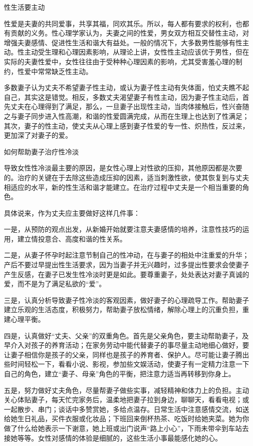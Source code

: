 \documentclass[12pt,UTF8]{ctexbook}
\begin{document}
性生活要主动


性爱是夫妻的共同爱事，共享其福，同欢其乐。所以，每人都有要求的权利，也都有贡献的义务。性心理学家认为，夫妻之间的性爱，男女双方相互交替性主动，对增强夫妻感情、促进性生活和谐大有益处。一般的情况下，大多数男性能够有性主动。性主动受生理和心理因素影响，从理论上讲，女性性主动应该优于男性，但在实际的夫妻性爱中，女性往往由于受种种心理因素的影响，尤其受害羞心理的制约，性爱中常常缺乏性主动。

多数妻子认为丈夫不希望妻子性主动，或认为妻子性主动有失体面，怕丈夫瞧不起自己，其实这是错觉。相反，多数丈夫渴望妻子有性主动，因为妻子性主动后，首先丈夫在心理得到了满足，那么，一旦妻子出现性主动，当肉体接触后，性兴奋随之与妻子同步进入性高潮，和谐的性爱圆满完成，从而在生理上也达到了性满足；其次，妻子的性主动，使丈夫从心理上感到妻子性爱的专一性、炽热性，反过来，更加深了对妻子的爱。





如何帮助妻子治疗性冷淡


导致女性性冷淡最主要的原因，是女性心理上对性欲的压抑，其他原因都是次要的。治疗的关键在于去除这些造成压抑的因素，适当刺激性欲，使其恢复到与丈夫相适应的水平，新的性生活和谐才能建立。在治疗过程中丈夫是一个相当重要的角色。

具体说来，作为丈夫应主要做好这样几件事：

一是，从预防的观点出发，从新婚开始就要注意夫妻感情的培养，注意性技巧的运用，建立情投意合、高度和谐的性关系。

二是，从妻子怀孕时起注意节制自己的性冲动，在与妻子的相处中注重爱的升华；产后不要过早提出性生活要求，因为当妻子并无兴趣时，过多提出性要求会使妻子产生反感，在妻子已发生性冷淡时更是如此。要尊重妻子，处处表达对妻子真诚的爱，而不是为了满足私欲的“爱”。

三是，认真分析导致妻子性冷淡的客观因素，做好妻子的心理疏导工作。帮助妻子建立乐观的生活态度，积极努力，帮助妻子放松情绪，解除心理上的沉重负担，重建心理平衡。

四是，认真做好“丈夫、父亲”的双重角色。首先是父亲角色，要主动帮助妻子，及早介入对孩子的养育活动；在家务劳动中能代替妻子的事尽量主动地细心做好，要让妻子相信你是孩子的父亲，同样也是孩子的养育者、保护人。尽可能让妻子腾出些时间轻松一下，看看小说、影视，参加些文娱活动，使妻子有一定精力注意一下自己的角色，建立“妻子、母亲”角色的平衡，把注意力适当再转移到你身上。

五是，努力做好丈夫角色，尽量帮妻子做些实事，减轻精神和体力上的负担。主动关心体贴妻子，每天忙完家务后，温柔地把妻子拉到身边，聊聊天，看看电视；或一起散步、串门；谈话中多赞赏她，多给点温存。日常生活中注意感情交流，如送给她生日礼品，买件衣服或化妆品；下班回来倒杯热茶、吃饭时给她夹菜。她为你做了什么给她表示一下谢意，她上班或出门说声“路上小心”，下雨未带伞到车站去接她等等。女性对感情的体验是细腻的，这些生活小事最能感化她的心。
\end{document}
